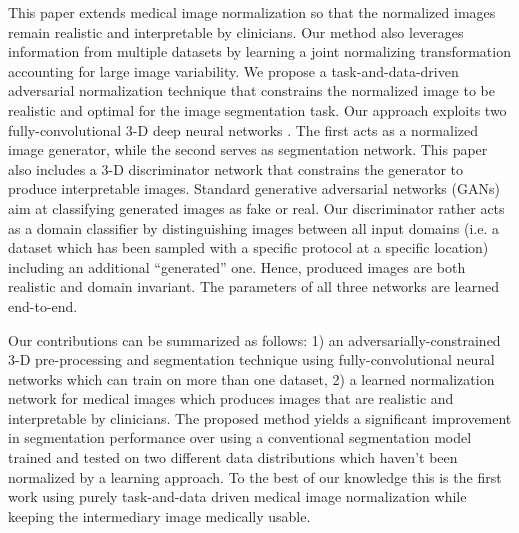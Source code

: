 \documentclass{article}
\begin{document}
This paper extends medical image normalization so that the normalized images remain realistic and interpretable by clinicians. Our method also leverages information from multiple datasets by learning a joint normalizing transformation accounting for large image variability. We propose a task-and-data-driven adversarial normalization technique that constrains the normalized image to be realistic and optimal for the image segmentation task. Our approach exploits two fully-convolutional 3-D deep neural networks \cite{RN10}. The first acts as a normalized image generator, while the second serves as segmentation network. This paper also includes a 3-D discriminator \cite{RN12} network that constrains the generator to produce interpretable images. Standard generative adversarial networks (GANs) \cite{Goodfellow2014} aim at classifying generated images as fake or real. Our discriminator rather acts as a domain classifier by distinguishing images between all input domains (i.e. a dataset which has been sampled with a specific protocol at a specific location) including an additional ``generated'' one. Hence, produced images are both realistic and domain invariant. The parameters of all three networks are learned end-to-end.

Our contributions can be summarized as follows: 1) an adversarially-constrained 3-D pre-processing and segmentation technique using fully-convolutional neural networks which can train on more than one dataset, 2) a learned normalization network for medical images which produces images that are realistic and interpretable by clinicians. The proposed method yields a significant improvement in segmentation performance over using a conventional segmentation model trained and tested on two different data distributions which haven't been normalized by a learning approach. To the best of our knowledge this is the first work using purely task-and-data driven medical image normalization while keeping the intermediary image medically usable.
\end{document}
